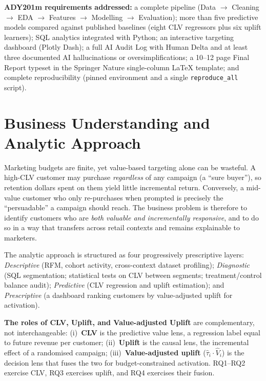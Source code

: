 \documentclass[pdflatex,sn-mathphys-num]{sn-jnl}
\begin{document}
\noindent\textbf{ADY201m requirements addressed:} a complete pipeline (Data $\rightarrow$ Cleaning
$\rightarrow$ EDA $\rightarrow$ Features $\rightarrow$ Modelling $\rightarrow$ Evaluation);
more than five predictive models compared against published baselines (eight CLV regressors plus
six uplift learners); SQL analytics integrated with Python; an interactive targeting dashboard
(Plotly Dash); a full AI Audit Log with Human Delta and at least three documented AI
hallucinations or oversimplifications; a 10--12 page Final Report typeset in the Springer Nature
single-column LaTeX template; and complete reproducibility (pinned environment and a single
\texttt{reproduce\_all} script).

\section{Business Understanding and Analytic Approach}\label{sec:biz}
Marketing budgets are finite, yet value-based targeting alone can be wasteful. A high-CLV customer
may purchase \emph{regardless} of any campaign (a ``sure buyer''), so retention dollars spent on
them yield little incremental return. Conversely, a mid-value customer who only re-purchases when
prompted is precisely the ``persuadable'' a campaign should reach. The business problem is
therefore to identify customers who are \emph{both valuable and incrementally responsive}, and to
do so in a way that transfers across retail contexts and remains explainable to marketers.

The analytic approach is structured as four progressively prescriptive layers:
\emph{Descriptive} (RFM, cohort activity, cross-context dataset profiling);
\emph{Diagnostic} (SQL segmentation; statistical tests on CLV between segments; treatment/control
balance audit); \emph{Predictive} (CLV regression and uplift estimation); and
\emph{Prescriptive} (a dashboard ranking customers by value-adjusted uplift for activation).

\noindent\textbf{The roles of CLV, Uplift, and Value-adjusted Uplift} are complementary, not
interchangeable: (i)~\textbf{CLV} is the predictive value lens, a regression label equal to future
revenue per customer; (ii)~\textbf{Uplift} is the causal lens, the incremental effect of a
randomised campaign; (iii)~\textbf{Value-adjusted uplift} ($\hat\tau_i\cdot\hat V_i$) is the
decision lens that fuses the two for budget-constrained activation. RQ1--RQ2 exercise CLV, RQ3
exercises uplift, and RQ4 exercises their fusion.
\end{document}
